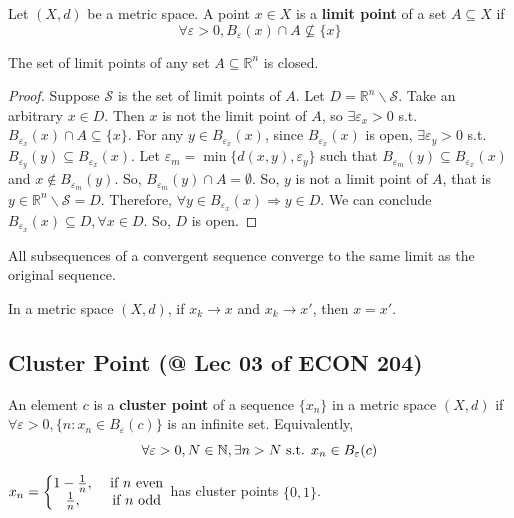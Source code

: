 \documentclass[11pt]{elegantbook}
\begin{document}
\begin{definition}
    \normalfont
    Let $(X,d)$ be a metric space. A point $x\in X$ is a \textbf{limit point} of a set $A\subseteq X$ if $$\forall \varepsilon>0, B_\varepsilon(x)\cap A\nsubseteq\{x\}$$
\end{definition}

\begin{theorem}
    The set of limit points of any set $A\subseteq \mathbb{R}^n$ is closed.
\end{theorem}
\begin{proof}
    Suppose $\mathcal{S}$ is the set of limit points of $A$. Let $D=\mathbb{R}^n\backslash \mathcal{S}$. Take an arbitrary $x\in D$. Then $x$ is not the limit point of $A$, so $\exists\varepsilon_x>0$ s.t. $B_{\varepsilon_x}(x)\cap A\subseteq\{x\}$. For any $y\in B_{\varepsilon_x}(x)$, since $B_{\varepsilon_x}(x)$ is open, $\exists \varepsilon_y>0$ s.t. $B_{\varepsilon_y}(y)\subseteq B_{\varepsilon_x}(x)$. Let $\varepsilon_m=\min\{d(x,y),\varepsilon_y\}$ such that $B_{\varepsilon_m}(y)\subseteq B_{\varepsilon_x}(x)$ and $x\notin B_{\varepsilon_m}(y)$. So, $B_{\varepsilon_m}(y)\cap A=\emptyset$. So, $y$ is not a limit point of $A$, that is $y\in \mathbb{R}^n\backslash \mathcal{S}=D$. Therefore, $\forall y\in B_{\varepsilon_x}(x) \Rightarrow y\in D$. We can conclude $B_{\varepsilon_x}(x)\subseteq D, \forall x\in D$. So, $D$ is open.
\end{proof}

\begin{theorem}
    All subsequences of a convergent sequence converge to the same limit as the original sequence.
\end{theorem}

\begin{theorem}
    In a metric space $(X, d)$, if $x_{k} \rightarrow x$ and $x_{k} \rightarrow x'$, then $x=x'$.
\end{theorem}

\subsection{Cluster Point \small{(@ Lec 03 of ECON 204)}}
\begin{definition}
\normalfont
    An element $c$ is a \textbf{cluster point} of a sequence $\{x_n\}$ in a metric space $(X, d)$ if $\forall\varepsilon > 0, \{n : x_n \in B_\varepsilon(c)\}$ is an infinite set. Equivalently, $$\forall\varepsilon > 0, N\in \mathbb{N}, \exists n>N \textnormal{ s.t. } x_n \in B_\varepsilon(c)$$
\end{definition}
\begin{example}
    $x_n=\left\{\begin{matrix}
        1-\frac{1}{n},& \textnormal{ if $n$ even}\\
        \frac{1}{n},&\textnormal{ if $n$ odd}
    \end{matrix}\right.$ has cluster points $\{0,1\}$.
\end{example}
\end{document}
